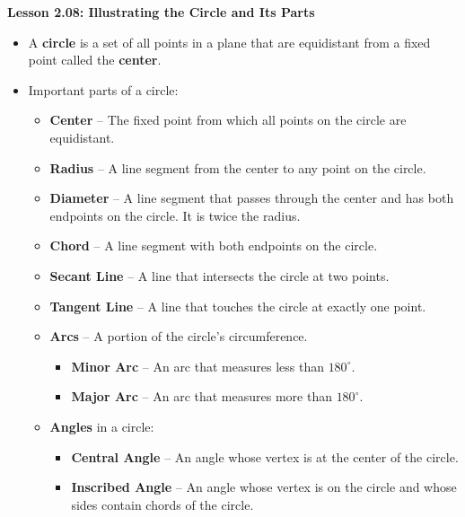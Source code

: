 \begin{center}
\textbf{Lesson 2.08: Illustrating the Circle and Its Parts}
\end{center}

\vspace*{-1.5ex}


\begin{itemize}
    \item A \textbf{circle} is a set of all points in a plane that are equidistant from a fixed point called the \textbf{center}.
    \item Important parts of a circle:
    \begin{itemize}
        \item \textbf{Center} – The fixed point from which all points on the circle are equidistant.
        \item \textbf{Radius} – A line segment from the center to any point on the circle.
        \item \textbf{Diameter} – A line segment that passes through the center and has both endpoints on the circle. It is twice the radius.
        \item \textbf{Chord} – A line segment with both endpoints on the circle.
        \item \textbf{Secant Line} – A line that intersects the circle at two points.
        \item \textbf{Tangent Line} – A line that touches the circle at exactly one point.
        \item \textbf{Arcs} – A portion of the circle’s circumference.
        \begin{itemize}
            \item \textbf{Minor Arc} – An arc that measures less than $180^\circ$.
            \item \textbf{Major Arc} – An arc that measures more than $180^\circ$.
        \end{itemize}
        \item \textbf{Angles} in a circle:
        \begin{itemize}
            \item \textbf{Central Angle} – An angle whose vertex is at the center of the circle.
            \item \textbf{Inscribed Angle} – An angle whose vertex is on the circle and whose sides contain chords of the circle.
        \end{itemize}
    \end{itemize}
\end{itemize}

